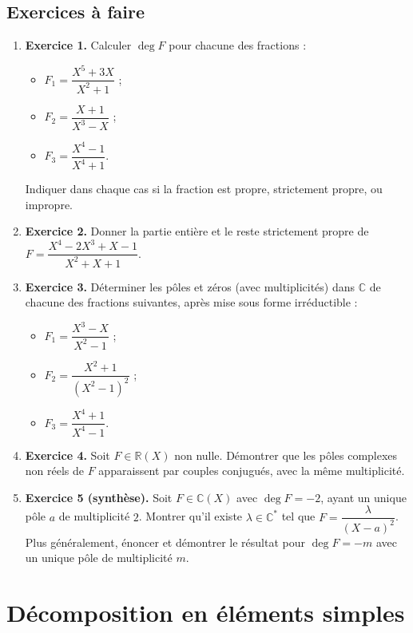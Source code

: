 \subsection{Exercices à faire}
\begin{enumerate}
    \item \textbf{Exercice 1.} Calculer $\deg F$ pour chacune des fractions :
    \begin{itemize}
        \item $F_1 = \dfrac{X^5 + 3X}{X^2 + 1}$ ;
        \item $F_2 = \dfrac{X + 1}{X^3 - X}$ ;
        \item $F_3 = \dfrac{X^4 - 1}{X^4 + 1}$.
    \end{itemize}
    Indiquer dans chaque cas si la fraction est propre, strictement propre, ou impropre.
    \item \textbf{Exercice 2.} Donner la partie entière et le reste strictement propre de $F = \dfrac{X^4 - 2X^3 + X - 1}{X^2 + X + 1}$.
    \item \textbf{Exercice 3.} Déterminer les pôles et zéros (avec multiplicités) dans $\mathbb{C}$ de chacune des fractions suivantes, après mise sous forme irréductible :
    \begin{itemize}
        \item $F_1 = \dfrac{X^3 - X}{X^2 - 1}$ ;
        \item $F_2 = \dfrac{X^2 + 1}{(X^2 - 1)^2}$ ;
        \item $F_3 = \dfrac{X^4 + 1}{X^4 - 1}$.
    \end{itemize}
    \item \textbf{Exercice 4.} Soit $F \in \mathbb{R}(X)$ non nulle. Démontrer que les pôles complexes non réels de $F$ apparaissent par couples conjugués, avec la même multiplicité.
    \item \textbf{Exercice 5 (synthèse).} Soit $F \in \mathbb{C}(X)$ avec $\deg F = -2$, ayant un unique pôle $a$ de multiplicité $2$. Montrer qu'il existe $\lambda \in \mathbb{C}^*$ tel que $F = \dfrac{\lambda}{(X - a)^2}$. Plus généralement, énoncer et démontrer le résultat pour $\deg F = -m$ avec un unique pôle de multiplicité $m$.
\end{enumerate}

\section{Décomposition en éléments simples}


